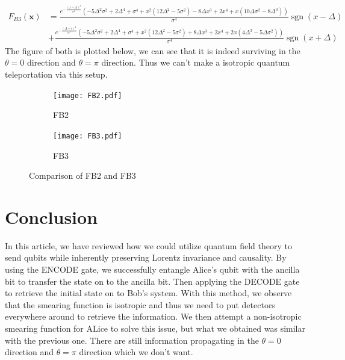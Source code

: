 \documentclass[a4paper,12pt]{article}
\begin{document}
{\footnotesize\begin{align*}
    F_{B3}(\mathbf{x}) &= \frac{e^{-\frac{(x-\Delta )^2}{\sigma ^2}} \left(-5 \Delta ^2 \sigma ^2+2 \Delta ^4+\sigma ^4+x^2 \left(12 \Delta ^2-5 \sigma ^2\right)-8 \Delta  x^3+2 x^4+x \left(10 \Delta  \sigma ^2-8 \Delta ^3\right)\right)}{\sigma ^4}\operatorname{sgn}(x - \Delta)\\
    &+\frac{e^{-\frac{(\Delta +x)^2}{\sigma ^2}} \left(-5 \Delta ^2 \sigma ^2+2 \Delta ^4+\sigma ^4+x^2 \left(12 \Delta ^2-5 \sigma ^2\right)+8 \Delta  x^3+2 x^4+2 x \left(4 \Delta ^3-5 \Delta  \sigma ^2\right)\right)}{\sigma ^4}\operatorname{sgn}(x + \Delta) 
\end{align*}}
The figure of both is plotted below, we can see that it is indeed surviving in the \(\theta = 0\) direction and \(\theta = \pi\) direction. Thus we can't make a isotropic quantum teleportation via this setup.

\begin{figure}[htbp]
    \centering
    \begin{subfigure}[b]{0.45\textwidth}
        \texttt{[image: FB2.pdf]}
        \caption{FB2}
        \label{fig:sub1}
    \end{subfigure}
    \hfill
    \begin{subfigure}[b]{0.45\textwidth}
        \texttt{[image: FB3.pdf]}
        \caption{FB3}
        \label{fig:sub2}
    \end{subfigure}
    \caption{Comparison of FB2 and FB3}
    \label{fig:combined}
\end{figure}

\section{Conclusion}
In this article, we have reviewed how we could utilize quantum field theory to send qubits while inherently preserving Lorentz invariance and causality. By using the ENCODE gate, we successfully entangle Alice's qubit with the ancilla bit to transfer the state on to the ancilla bit. Then applying the DECODE gate to retrieve the initial state on to Bob's system. With this method, we observe that the smearing function is isotropic and thus we need to put detectors everywhere around to retrieve the information. We then attempt a non-isotropic smearing function for ALice to solve this issue, but what we obtained was similar with the previous one. There are still information propagating in the \(\theta = 0\) direction and \(\theta = \pi\) direction which we don't want.
\appendix
\end{document}
